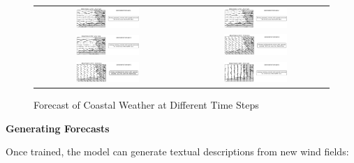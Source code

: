 \begin{figure}[h]
    \centering
    \begin{tabular}{cc}
        \includegraphics[width=0.45\textwidth]{images/coastal_fcst_00.png} & 
        \includegraphics[width=0.45\textwidth]{images/coastal_fcst_01.png} \\
        \includegraphics[width=0.45\textwidth]{images/coastal_fcst_02.png} & 
        \includegraphics[width=0.45\textwidth]{images/coastal_fcst_03.png} \\
        \includegraphics[width=0.45\textwidth]{images/coastal_fcst_04.png} & 
        \includegraphics[width=0.45\textwidth]{images/coastal_fcst_05.png} \\
    \end{tabular}
    \caption{Forecast of Coastal Weather at Different Time Steps}
    \label{fig:coastal_forecast}
\end{figure}

{\bf Generating Forecasts}

Once trained, the model can generate textual descriptions from new wind fields:

